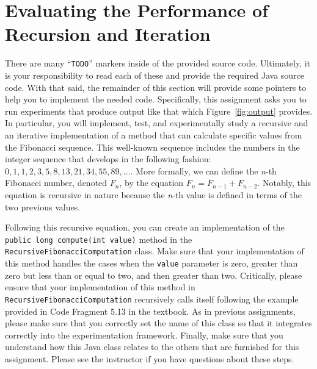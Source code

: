 \documentclass[11pt]{article}
\newcommand{\command}[1]{``\lstinline{#1}''}
\newcommand{\program}[1]{\lstinline{#1}}
\begin{document}
\section*{Evaluating the Performance of Recursion and Iteration}

There are many \command{TODO} markers inside of the provided source code.
Ultimately, it is your responsibility to read each of these and provide the
required Java source code. With that said, the remainder of this section will
provide some pointers to help you to implement the needed code. Specifically,
this assignment asks you to run experiments that produce output like that which
Figure~\ref{fig:output} provides. In particular, you will implement, test, and
experimentally study a recursive and an iterative implementation of a method
that can calculate specific values from the Fibonacci sequence. This well-known
sequence includes the numbers in the integer sequence that develops in the
following fashion: $0, 1, 1, 2, 3, 5, 8, 13, 21, 34, 55, 89, \ldots$. More
formally, we can define the {\em n}-th Fibonacci number, denoted $F_n$, by the
equation $F_n = F_{n-1} + F_{n-2}$. Notably, this equation is recursive in
nature because the {\em n}-th value is defined in terms of the two previous
values.

Following this recursive equation, you can create an implementation of the
\program{public long compute(int value)} method in the
\program{RecursiveFibonacciComputation} class. Make sure that your
implementation of this method handles the cases when the \program{value}
parameter is zero, greater than zero but less than or equal to two, and then
greater than two. Critically, please ensure that your implementation of this
method in \program{RecursiveFibonacciComputation} recursively calls itself
following the example provided in Code Fragment 5.13 in the textbook. As in
previous assignments, please make sure that you correctly set the name of this
class so that it integrates correctly into the experimentation framework. Finally,
make sure that you understand how this Java class relates to the others that are
furnished for this assignment. Please see the instructor if you have questions
about these steps.
\end{document}
